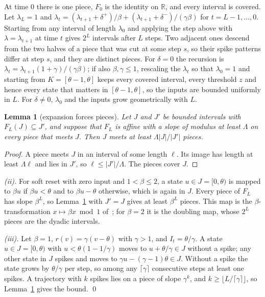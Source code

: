\documentclass[10pt]{article}
\newtheorem{lemma}[theorem]{Lemma}
\theoremstyle{remark}
\begin{document}
At time $0$ there is one piece, $F_0$ is the identity on $\mathbb R$, and every interval is covered. Let $\lambda_L=1$ and $\lambda_t=(\lambda_{t+1}+\delta^+)/\beta+(\lambda_{t+1}+\delta^-)/(\gamma\beta)$ for $t=L-1,\ldots,0$. Starting from any interval of length $\lambda_0$ and applying the step above with $\lambda=\lambda_{t+1}$ at time $t$ gives $2^L$ intervals after $L$ steps. Two adjacent ones descend from the two halves of a piece that was cut at some step $s$, so their spike patterns differ at step $s$, and they are distinct pieces. For $\delta=0$ the recursion is $\lambda_t=\lambda_{t+1}(1+\gamma)/(\gamma\beta)$; if also $\beta,\gamma\le1$, rescaling the $\lambda_t$ so that $\lambda_0=1$ and starting from $K=[\theta-1,\theta]$ keeps every covered interval, every threshold $z$ and hence every state that matters in $[\theta-1,\theta]$, so the inputs are bounded uniformly in $L$. For $\delta\neq0$, $\lambda_0$ and the inputs grow geometrically with $L$.

\begin{lemma}[expansion forces pieces]
\label{lem:expand}
Let $J$ and $J'$ be bounded intervals with $F_L(J)\subseteq J'$, and suppose that $F_L$ is affine with a slope of modulus at least $\Lambda$ on every piece that meets $J$. Then $J$ meets at least $\Lambda|J|/|J'|$ pieces.
\end{lemma}
\begin{proof}
A piece meets $J$ in an interval of some length $\ell$. Its image has length at least $\Lambda\ell$ and lies in $J'$, so $\ell\le|J'|/\Lambda$. The pieces cover $J$.
\end{proof}

\emph{(ii).} For soft reset with zero input and $1<\beta\le2$, a state $u\in J=[0,\theta)$ is mapped to $\beta u$ if $\beta u<\theta$ and to $\beta u-\theta$ otherwise, which is again in $J$. Every piece of $F_L$ has slope $\beta^L$, so Lemma~\ref{lem:expand} with $J'=J$ gives at least $\beta^L$ pieces. This map is the $\beta$-transformation $x\mapsto\beta x\bmod1$ of~\citet{renyi1957}; for $\beta=2$ it is the doubling map, whose $2^L$ pieces are the dyadic intervals.

\emph{(iii).} Let $\beta=1$, $r(v)=\gamma(v-\theta)$ with $\gamma>1$, and $I_t=\theta/\gamma$. A state $u\in J=[0,\theta)$ with $u<\theta(1-1/\gamma)$ moves to $u+\theta/\gamma\in J$ without a spike; any other state in $J$ spikes and moves to $\gamma u-(\gamma-1)\theta\in J$. Without a spike the state grows by $\theta/\gamma$ per step, so among any $\lceil\gamma\rceil$ consecutive steps at least one spikes. A trajectory with $k$ spikes lies on a piece of slope $\gamma^k$, and $k\ge\lfloor L/\lceil\gamma\rceil\rfloor$, so Lemma~\ref{lem:expand} gives the bound. \qed
\end{document}
